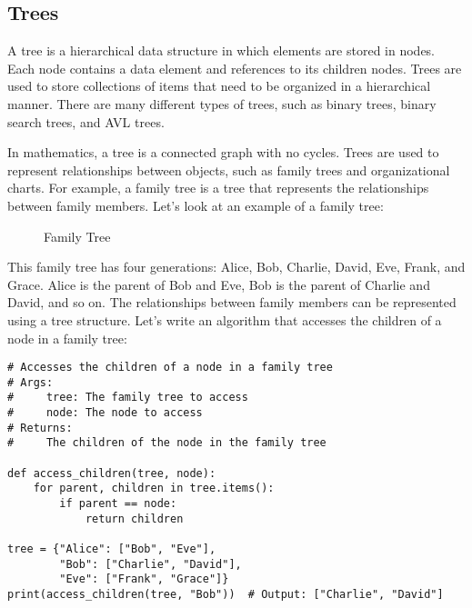 \subsection{Trees}

A tree is a hierarchical data structure in which elements are stored in nodes. Each node contains a data element and references to its children nodes. Trees are used to store collections of items that need to be organized in a hierarchical manner. There are many different types of trees, such as binary trees, binary search trees, and AVL trees.

In mathematics, a tree is a connected graph with no cycles. Trees are used to represent relationships between objects, such as family trees and organizational charts. For example, a family tree is a tree that represents the relationships between family members. Let's look at an example of a family tree:


\begin{figure}[H]
    \centering
    \caption{Family Tree}\label{fig:family-tree}
\end{figure}


This family tree has four generations: Alice, Bob, Charlie, David, Eve, Frank, and Grace. Alice is the parent of Bob and Eve, Bob is the parent of Charlie and David, and so on. The relationships between family members can be represented using a tree structure. Let's write an algorithm that accesses the children of a node in a family tree:

\begin{lstlisting}
# Accesses the children of a node in a family tree
# Args:
#     tree: The family tree to access
#     node: The node to access
# Returns:
#     The children of the node in the family tree

def access_children(tree, node):
    for parent, children in tree.items():
        if parent == node:
            return children

tree = {"Alice": ["Bob", "Eve"],
        "Bob": ["Charlie", "David"],
        "Eve": ["Frank", "Grace"]}
print(access_children(tree, "Bob"))  # Output: ["Charlie", "David"]
\end{lstlisting}


